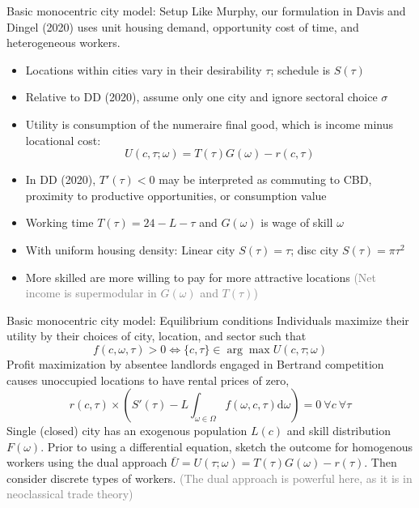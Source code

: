 \documentclass[11pt,notes=hide,aspectratio=169]{beamer}
\begin{document}
\begin{frame}{Basic monocentric city model: Setup}
Like Murphy, our formulation in Davis and Dingel (2020)
uses unit housing demand, opportunity cost of time, and heterogeneous workers.
\begin{itemize}
\item Locations within cities vary in their desirability $\tau$; schedule is $S(\tau)$ 
\item Relative to DD (2020), assume only one city and ignore sectoral choice $\sigma$
\item Utility is consumption of the numeraire final good, which is income minus locational cost:
\begin{equation*}
U(c,\tau;\omega)
=
T(\tau)G(\omega)-r(c,\tau)
\end{equation*}
\item In DD (2020), $T'(\tau)<0$ may be interpreted as commuting to CBD, proximity to
productive opportunities, or consumption value
\item Working time $T(\tau) = 24 - L - \tau$ and $G(\omega)$ is wage of skill $\omega$
\item With uniform housing density: Linear city $S(\tau) = \tau$; disc city $S(\tau) = \pi \tau^{2}$
\item More skilled are more willing to pay for more attractive locations
\textcolor{gray}{(Net income is supermodular in $G(\omega)$ and $T(\tau)$)}
\end{itemize}
\end{frame}
\begin{frame}{Basic monocentric city model: Equilibrium conditions}
Individuals maximize their utility by their choices of city, location, and sector such that
\begin{equation*}
f(c,\omega,\tau)>0\iff\{c,\tau\}\in\arg\max U(c,\tau;\omega)
\end{equation*}
Profit maximization by absentee landlords engaged in Bertrand competition causes unoccupied locations to have rental prices of zero,
\begin{equation*}
r(c,\tau)\times\left(S'(\tau)-L \int_{\omega\in\Omega}f(\omega,c,\tau)\textrm{d}\omega\right)=0\ \forall c\ \forall\tau
\end{equation*}
Single (closed) city has an exogenous population $L(c)$ and skill distribution $F(\omega)$.
\medskip
Prior to using a differential equation,
sketch the outcome for homogenous workers using the dual approach 
$\bar{U} = U(\tau; \omega) = T(\tau) G(\omega) - r(\tau)$.
Then consider discrete types of workers.
\textcolor{gray}{(The dual approach is powerful here, as it is in neoclassical trade theory)}
\end{frame}
\end{document}
